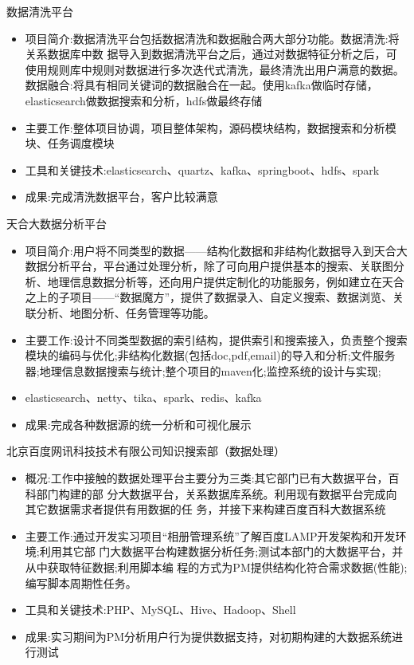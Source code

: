 \documentclass{resume}
\begin{document}
\begin{onehalfspacing}
数据清洗平台
\begin{itemize}
  \item 项目简介:数据清洗平台包括数据清洗和数据融合两大部分功能。数据清洗:将关系数据库中数 据导入到数据清洗平台之后，通过对数据特征分析之后，可使用规则库中规则对数据进行多次迭代式清洗，最终清洗出用户满意的数据。数据融合:将具有相同关键词的数据融合在一起。使用kafka做临时存储，elasticsearch做数据搜索和分析，hdfs做最终存储
  \item 主要工作:整体项目协调，项目整体架构，源码模块结构，数据搜索和分析模块、任务调度模块
  \item 工具和关键技术:elasticsearch、quartz、kafka、springboot、hdfs、spark
  \item 成果:完成清洗数据平台，客户比较满意
\end{itemize}
\end{onehalfspacing}
\begin{onehalfspacing}
天合大数据分析平台
\begin{itemize}
  \item 项目简介:用户将不同类型的数据——结构化数据和非结构化数据导入到天合大数据分析平台，平台通过处理分析，除了可向用户提供基本的搜索、关联图分析、地理信息数据分析等，还向用户提供定制化的功能服务，例如建立在天合之上的子项目——“数据魔方”，提供了数据录入、自定义搜索、数据浏览、关联分析、地图分析、任务管理等功能。
  \item 主要工作:设计不同类型数据的索引结构，提供索引和搜索接入，负责整个搜索模块的编码与优化;非结构化数据(包括doc,pdf,email)的导入和分析;文件服务器;地理信息数据搜索与统计;整个项目的maven化;监控系统的设计与实现;
  \item elasticsearch、netty、tika、spark、redis、kafka
  \item 成果:完成各种数据源的统一分析和可视化展示
\end{itemize}
\end{onehalfspacing}

\begin{onehalfspacing}
北京百度网讯科技技术有限公司知识搜索部（数据处理）
\begin{itemize}
  \item 概况:工作中接触的数据处理平台主要分为三类:其它部门已有大数据平台，百科部门构建的部 分大数据平台，关系数据库系统。利用现有数据平台完成向其它数据需求者提供有用数据的任 务，并接下来构建百度百科大数据系统
  \item 主要工作:通过开发实习项目“相册管理系统”了解百度LAMP开发架构和开发环境;利用其它部 门大数据平台构建数据分析任务;测试本部门的大数据平台，并从中获取特征数据;利用脚本编 程的方式为PM提供结构化符合需求数据(性能);编写脚本周期性任务。
  \item 工具和关键技术:PHP、MySQL、Hive、Hadoop、Shell
  \item 成果:实习期间为PM分析用户行为提供数据支持，对初期构建的大数据系统进行测试
\end{itemize}
\end{onehalfspacing}
\end{document}
